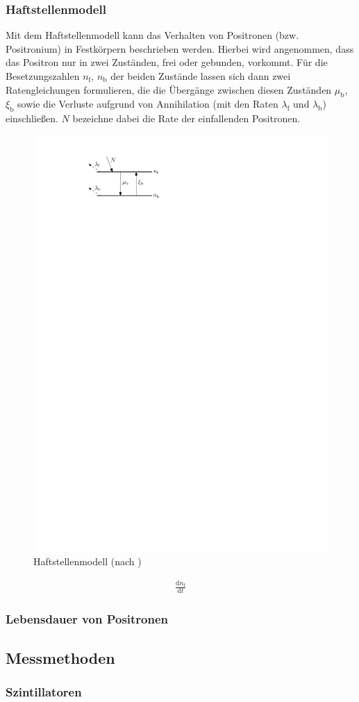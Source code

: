 \documentclass[11pt, a4paper]{article}
\numberwithin{equation}{section}
\begin{document}
\subsubsection{Haftstellenmodell}

Mit dem Haftstellenmodell kann das Verhalten von Positronen (bzw. Positronium) in Festkörpern beschrieben werden.
Hierbei wird angenommen, dass das Positron nur in zwei Zuständen, frei oder gebunden, vorkommt.
Für die Besetzungszahlen $n_\mathrm{f}$, $n_\mathrm{b}$ der beiden Zustände lassen sich dann zwei Ratengleichungen formulieren, die die Übergänge zwischen diesen Zuständen $\mu_\mathrm{b}$, $\xi_\mathrm{b}$ sowie die Verluste aufgrund von Annihilation (mit den Raten $\lambda_\mathrm{f}$ und $\lambda_\mathrm{b}$) einschließen.
$N$ bezeichne dabei die Rate der einfallenden Positronen.
\begin{figure}[htbp]
	\centering
	\includegraphics[width=.4\textwidth]{./figures/trapping_model}
	\caption{Haftstellenmodell (nach \cite{schatz})}
\end{figure}
\begin{align}
	\frac{\mathrm{d}n_\mathrm{f}}{\mathrm{d}t}
\end{align}


\subsubsection{Lebensdauer von Positronen}

\subsection{Messmethoden}

\subsubsection{Szintillatoren}
\end{document}
